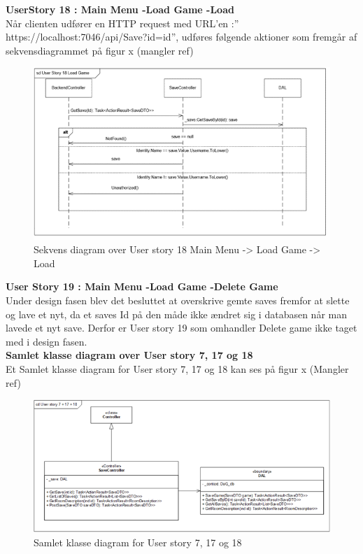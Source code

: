 \textbf{UserStory 18 : Main Menu -\g Load Game -\g Load}\\
Når clienten udfører en HTTP request med URL’en :” https://localhost:7046/api/Save?id={id}”, udføres følgende aktioner som fremgår af sekvensdiagrammet på figur x (mangler ref)\\

\begin{figure}[H]
\centering
\includegraphics[width = \textwidth]{02-Body/Images/Backend_sekvens_18.PNG}
\caption{Sekvens diagram over User story 18 Main Menu -> Load Game -> Load}
\label{fig:Design-Backend-Sekvens-18}
\end{figure}

\textbf{User Story 19 : Main Menu -\g Load Game -\g Delete Game}\\

Under design fasen blev det besluttet at overskrive gemte saves fremfor at slette og lave et nyt, da et saves Id på den måde ikke ændret sig i databasen når man lavede et nyt save. Derfor er User story 19 som omhandler Delete game ikke taget med i design fasen.\\

\textbf{Samlet klasse diagram over User story 7, 17 og 18}\\
Et Samlet klasse diagram for User story 7, 17 og 18 kan ses på figur x (Mangler ref)\\

\begin{figure}[H]
\centering
\includegraphics[width = \textwidth]{02-Body/Images/Backend_klasse_7_17_18.PNG}
\caption{Samlet klasse diagram for User story 7, 17 og 18}
\label{fig:Design-Backend-Sekvens-7-17-18}
\end{figure}

